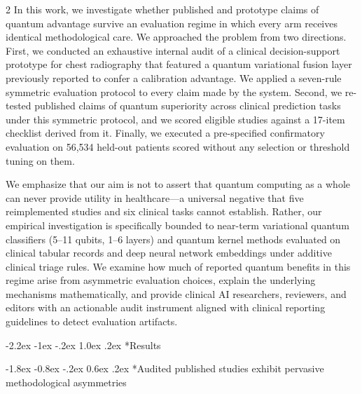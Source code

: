 \documentclass[10pt,a4paper,twoside]{article}
\makeatletter
\renewcommand{\section}{\@startsection{section}{1}{\z@}%
  {-2.2ex \@plus -1ex \@minus -.2ex}%
  {1.0ex \@plus.2ex}%
  {\normalfont\large\sffamily\bfseries\color{naturedark}}}
\renewcommand{\subsection}{\@startsection{subsection}{2}{\z@}%
  {-1.8ex \@plus -0.8ex \@minus -.2ex}%
  {0.6ex \@plus.2ex}%
  {\normalfont\normalsize\sffamily\bfseries\color{naturedark}}}
\makeatother
\begin{document}
\begin{multicols}{2}
In this work, we investigate whether published and prototype claims of quantum advantage survive an evaluation regime in which every arm receives identical methodological care. We approached the problem from two directions. First, we conducted an exhaustive internal audit of a clinical decision-support prototype for chest radiography that featured a quantum variational fusion layer previously reported to confer a calibration advantage. We applied a seven-rule symmetric evaluation protocol to every claim made by the system. Second, we re-tested published claims of quantum superiority across clinical prediction tasks under this symmetric protocol, and we scored eligible studies against a 17-item checklist derived from it. Finally, we executed a pre-specified confirmatory evaluation on 56,534 held-out patients scored without any selection or threshold tuning on them.

We emphasize that our aim is not to assert that quantum computing as a whole can never provide utility in healthcare---a universal negative that five reimplemented studies and six clinical tasks cannot establish. Rather, our empirical investigation is specifically bounded to near-term variational quantum classifiers (5--11 qubits, 1--6 layers) and quantum kernel methods evaluated on clinical tabular records and deep neural network embeddings under additive clinical triage rules. We examine how much of reported quantum benefits in this regime arise from asymmetric evaluation choices, explain the underlying mechanisms mathematically, and provide clinical AI researchers, reviewers, and editors with an actionable audit instrument aligned with clinical reporting guidelines \cite{collins2021,liu2020consort} to detect evaluation artifacts.

\section*{Results}

\subsection*{Audited published studies exhibit pervasive methodological asymmetries}


\end{multicols}
\end{document}
